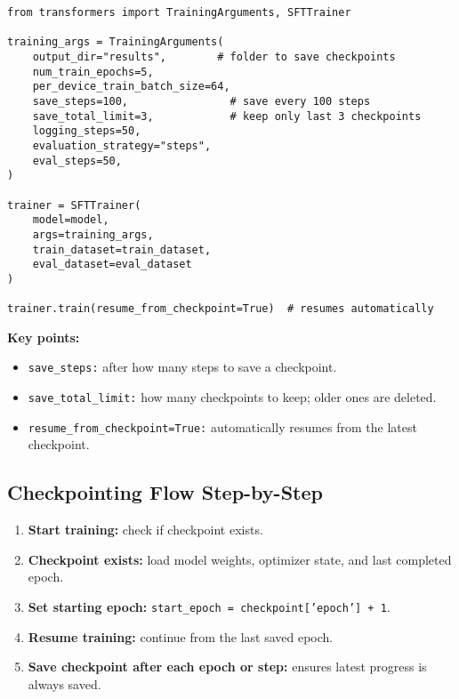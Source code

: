 \begin{tcolorbox}[colback=green!5!white, colframe=green!75!black, title=TrainingArguments Example]
\begin{verbatim}
from transformers import TrainingArguments, SFTTrainer

training_args = TrainingArguments(
    output_dir="results",        # folder to save checkpoints
    num_train_epochs=5,
    per_device_train_batch_size=64,
    save_steps=100,                # save every 100 steps
    save_total_limit=3,            # keep only last 3 checkpoints
    logging_steps=50,
    evaluation_strategy="steps",
    eval_steps=50,
)

trainer = SFTTrainer(
    model=model,
    args=training_args,
    train_dataset=train_dataset,
    eval_dataset=eval_dataset
)

trainer.train(resume_from_checkpoint=True)  # resumes automatically
\end{verbatim}
\end{tcolorbox}

\textbf{Key points:}
\begin{itemize}
    \item \texttt{save\_steps:} after how many steps to save a checkpoint.
    \item \texttt{save\_total\_limit:} how many checkpoints to keep; older ones are deleted.
    \item \texttt{resume\_from\_checkpoint=True:} automatically resumes from the latest checkpoint.
\end{itemize}

\subsection{Checkpointing Flow Step-by-Step}
\begin{enumerate}
    \item \textbf{Start training:} check if checkpoint exists.
    \item \textbf{Checkpoint exists:} load model weights, optimizer state, and last completed epoch.
    \item \textbf{Set starting epoch:} \texttt{start\_epoch = checkpoint['epoch'] + 1}.
    \item \textbf{Resume training:} continue from the last saved epoch.
    \item \textbf{Save checkpoint after each epoch or step:} ensures latest progress is always saved.
\end{enumerate}

